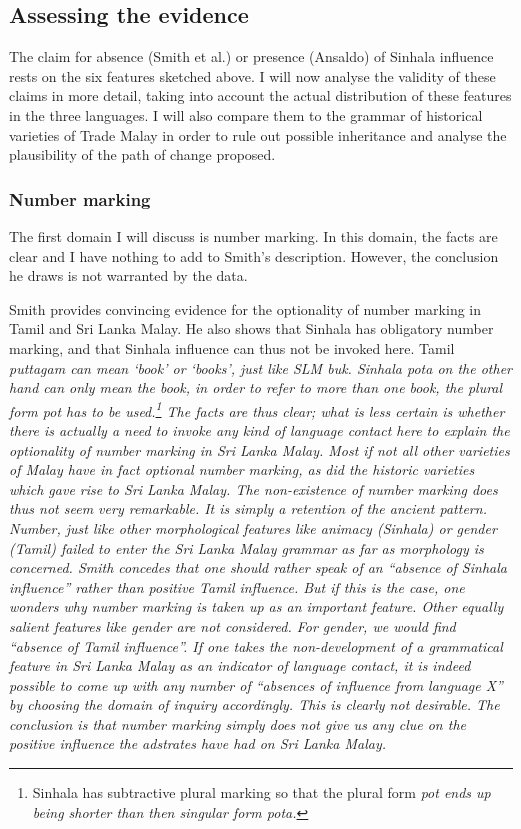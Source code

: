 \documentclass[a4paper,10pt]{article}
\begin{document}
\subsection{Assessing the evidence}
The claim for absence (Smith et al.) or presence (Ansaldo) of Sinhala influence rests on the six features sketched above. I will now analyse the validity of these claims in more detail, taking into account the actual distribution of these features in the three languages. I will also compare them to the grammar of historical varieties of Trade Malay in order to rule out possible inheritance and analyse the plausibility of the path of change proposed.


\subsubsection{Number marking}
The first domain I will discuss is number marking. In this domain, the facts are clear and I have nothing to add to Smith's description. However, the conclusion he draws is not warranted by the data.

Smith provides convincing evidence for the optionality of number marking in Tamil and Sri Lanka Malay. He also shows that Sinhala has obligatory number marking, and that Sinhala influence can thus not be invoked here. Tamil \em puttagam \em can mean `book' or `books', just like SLM \em buk\em. Sinhala \em pota \em on the other hand can only mean \em the book\em, in order to refer to more than one book, the plural form \em pot \em has to be used.\footnote{Sinhala
 has subtractive plural marking \citep{NitzEtAlfc} so that the plural form \em pot \em ends up being shorter than then singular form \em pota\em.
}
The facts are thus clear; what is less certain is whether there is actually a need to invoke any kind of language contact here to explain the optionality of number marking in Sri Lanka Malay. Most if not all other varieties of Malay have in fact optional number marking, as did the historic varieties which gave rise to Sri Lanka Malay. The non-existence of number marking does thus not seem  very remarkable. It is simply a retention of the ancient pattern. Number, just like other morphological features like animacy (Sinhala)  or gender (Tamil) failed to enter the Sri Lanka Malay grammar as far as morphology is concerned. Smith concedes that one should rather speak of an ``absence of Sinhala influence'' rather than positive Tamil influence. But if this is the case, one wonders why number marking is taken up as an important feature. Other equally salient features like gender are not considered. For gender, we would find ``absence of Tamil influence''. If one takes the non-development of a grammatical feature in Sri Lanka Malay as an indicator of language contact, it is indeed possible to come up with any number of ``absences of influence from language X'' by choosing the domain of inquiry accordingly. This is clearly not desirable. The conclusion is that number marking simply does not give us any clue on the positive influence the adstrates have had on Sri Lanka Malay.
\end{document}
